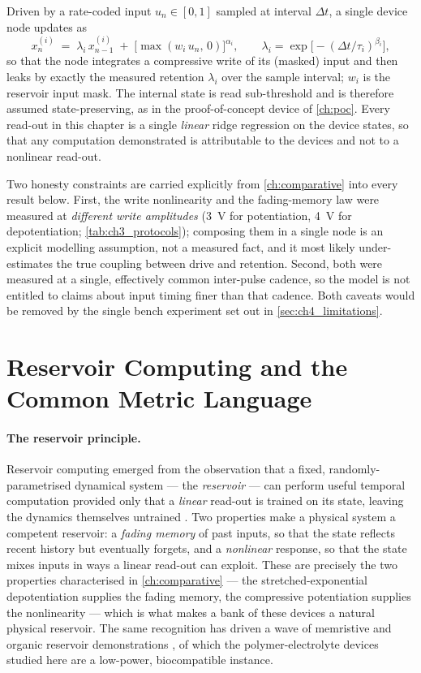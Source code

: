 \documentclass[12pt, twoside]{report}
\begin{document}
Driven by a rate-coded input $u_n \in [0,1]$ sampled at interval $\Delta t$, a single device node updates as
\[
  x^{(i)}_n \;=\; \lambda_i\, x^{(i)}_{n-1} \;+\; \big[\max(w_i\, u_n,\,0)\big]^{\alpha_i},
  \qquad \lambda_i = \exp\!\big[-(\Delta t/\tau_i)^{\beta_i}\big],
\]
so that the node integrates a compressive write of its (masked) input and then leaks by exactly the measured retention $\lambda_i$ over the sample interval; $w_i$ is the reservoir input mask. The internal state is read sub-threshold and is therefore assumed state-preserving, as in the proof-of-concept device of \cref{ch:poc}. Every read-out in this chapter is a single \emph{linear} ridge regression on the device states, so that any computation demonstrated is attributable to the devices and not to a nonlinear read-out.

Two honesty constraints are carried explicitly from \cref{ch:comparative} into every result below. First, the write nonlinearity and the fading-memory law were measured at \emph{different write amplitudes} (\SI{3}{\volt} for potentiation, \SI{4}{\volt} for depotentiation; \cref{tab:ch3_protocols}); composing them in a single node is an explicit modelling assumption, not a measured fact, and it most likely under-estimates the true coupling between drive and retention. Second, both were measured at a single, effectively common inter-pulse cadence, so the model is not entitled to claims about input timing finer than that cadence. Both caveats would be removed by the single bench experiment set out in \cref{sec:ch4_limitations}.

\section{Reservoir Computing and the Common Metric Language}\label{sec:ch4_framework}

\paragraph{The reservoir principle.} Reservoir computing emerged from the observation that a fixed, randomly-parametrised dynamical system --- the \emph{reservoir} --- can perform useful temporal computation provided only that a \emph{linear} read-out is trained on its state, leaving the dynamics themselves untrained \cite{Jaeger2001ESN,Maass2002LSM,LukoseviciusJaeger2009}. Two properties make a physical system a competent reservoir: a \emph{fading memory} of past inputs, so that the state reflects recent history but eventually forgets, and a \emph{nonlinear} response, so that the state mixes inputs in ways a linear read-out can exploit. These are precisely the two properties characterised in \cref{ch:comparative} --- the stretched-exponential depotentiation supplies the fading memory, the compressive potentiation supplies the nonlinearity --- which is what makes a bank of these devices a natural physical reservoir. The same recognition has driven a wave of memristive and organic reservoir demonstrations \cite{Tanaka2019,Du2017,Zhong2021,Cucchi2021}, of which the polymer-electrolyte devices studied here are a low-power, biocompatible instance.
\end{document}
